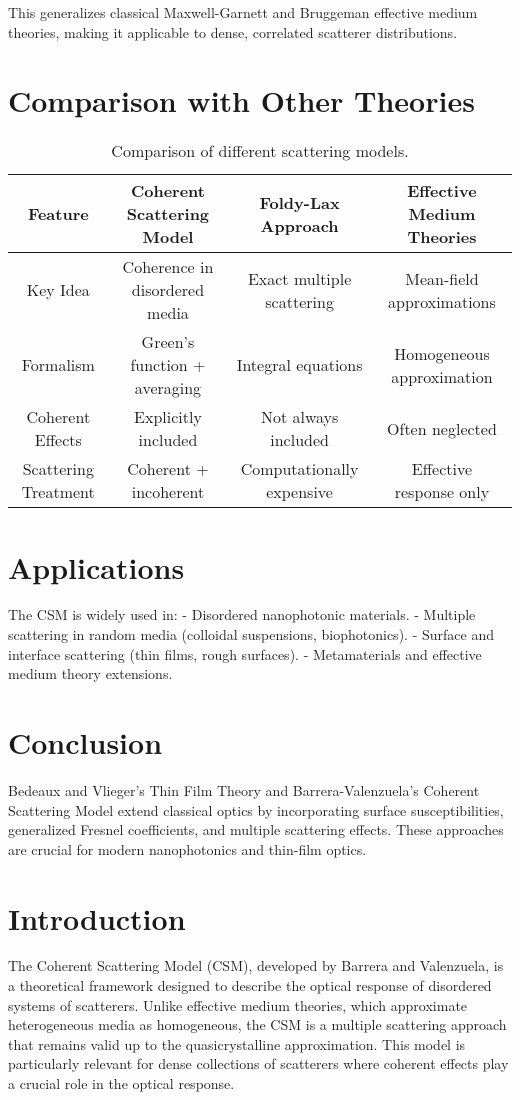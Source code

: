 \documentclass{article}
\begin{document}
	This generalizes classical Maxwell-Garnett and Bruggeman effective medium theories, making it applicable to dense, correlated scatterer distributions.
	
	\section{Comparison with Other Theories}
	\begin{table}[h]
		\centering
		\begin{tabular}{|c|c|c|c|}
			\hline
			Feature & Coherent Scattering Model & Foldy-Lax Approach & Effective Medium Theories \\
			\hline
			Key Idea & Coherence in disordered media & Exact multiple scattering & Mean-field approximations \\
			Formalism & Green’s function + averaging & Integral equations & Homogeneous approximation \\
			Coherent Effects & Explicitly included & Not always included & Often neglected \\
			Scattering Treatment & Coherent + incoherent & Computationally expensive & Effective response only \\
			\hline
		\end{tabular}
		\caption{Comparison of different scattering models.}
		\label{tab:comparison}
	\end{table}
	
	\section{Applications}
	The CSM is widely used in:
	- Disordered nanophotonic materials.
	- Multiple scattering in random media (colloidal suspensions, biophotonics).
	- Surface and interface scattering (thin films, rough surfaces).
	- Metamaterials and effective medium theory extensions.
	
	\section{Conclusion}
	Bedeaux and Vlieger’s Thin Film Theory and Barrera-Valenzuela’s Coherent Scattering Model extend classical optics by incorporating surface susceptibilities, generalized Fresnel coefficients, and multiple scattering effects. These approaches are crucial for modern nanophotonics and thin-film optics.
	
	
	\section{Introduction}
	The Coherent Scattering Model (CSM), developed by Barrera and Valenzuela, is a theoretical framework designed to describe the optical response of disordered systems of scatterers. Unlike effective medium theories, which approximate heterogeneous media as homogeneous, the CSM is a multiple scattering approach that remains valid up to the quasicrystalline approximation. This model is particularly relevant for dense collections of scatterers where coherent effects play a crucial role in the optical response.
	
\end{document}
